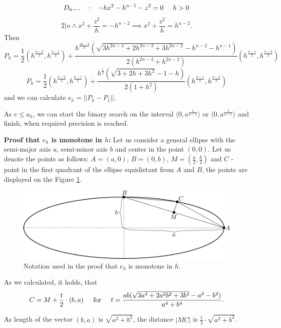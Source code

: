 $$D_{n--} \hspace{3mm} :\hspace{3mm}  -hx^2-h^{n-1}-z^2 = 0 \hspace{5mm} h>0$$
$$2|n \land x^2 + \frac{z^2}{h} = -h^{n-2} \implies x^2 + \frac{z^2}{h} = h^{n-2}.$$
Then 
$$P_h=\frac{1}{2}(h^\frac{n-2}{2},h^\frac{n-1}{2}) + \frac{h^\frac{2n-3}{2}(\sqrt{3h^{2n-4}+2h^{2n-3}+3h^{2n-2}}-h^{n-2}-h^{n-1})}{2(h^{2n-4}+h^{2n-2})}(h^\frac{n-1}{2},h^\frac{n-2}{2})$$
$$P_h=\frac{1}{2}(h^\frac{n-2}{2},h^\frac{n-1}{2}) + \frac{h^\frac{1}{2}(\sqrt{3+2h+3h^2}-1-h)}{2(1+h^2)}(h^\frac{n-1}{2},h^\frac{n-2}{2})$$
and we can calculate $e_h=||P_h-P_1||$.

As $e \leq a_h$, we can start the binary search on the interval
$\langle 0, a^\frac{2}{n-2}\rangle$ or $\langle 0, a^\frac{2}{n-1}\rangle$
and finish, when required precision is reached.

\textbf{Proof that $e_h$ is monotone in $h$:} Let us consider a general ellipse
with the semi-major axis $a$, semi-minor axis $b$ and center in the point $(0, 0)$. 
Let us denote the points as follows: $A=(a, 0)$, $B=(0, b)$, $M=(\frac{a}{2}, \frac{b}{2})$ 
and $C$ - point in the first quadrant of the ellipse equidistant from $A$ and $B$, the points
are displayed on the Figure \ref{img:40}.

\begin{figure}
    \centerline{\includegraphics[scale=0.5]{images/img40}}
    \caption[Notation used in the proof]
    {Notation used in the proof that $e_h$ is monotone in $h$.}
    \label{img:40}
\end{figure}

As we calculated, it holds, that
$$C = M + \frac{t}{2} \cdot (b, a) \hspace{5mm} \textrm{for} \hspace{5mm} t=\frac{ab(\sqrt{3a^4+2a^2b^2+3b^4}-a^2-b^2)}{a^4+b^4}.$$

As length of the vector $(b,a)$ is $\sqrt{a^2+b^2}$, the distance 
$|MC|$ is $\frac{t}{2} \cdot \sqrt{a^2+b^2}$.

